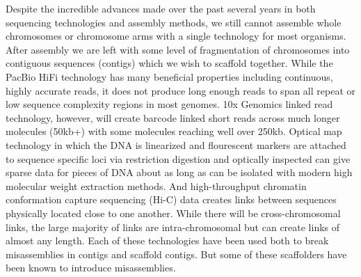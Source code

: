 \par{
Despite the incredible advances made over the past several years in both sequencing technologies and assembly methods, we still cannot assemble whole chromosomes or chromosome arms with a 
single technology for most organisms. After assembly we are left with some level of fragmentation of chromosomes into contiguous sequences (contigs) which we wish to scaffold together. While the 
PacBio HiFi technology has many beneficial properties including continuous, highly accurate reads, it does not produce long enough reads to span all repeat or low sequence complexity regions in most genomes.
 10x Genomics linked read technology, however, will create barcode linked short reads across much longer molecules (50kb+) with some molecules reaching well over 250kb\cite{10xlinked}. Optical map technology in which the DNA is linearized and flourescent markers are attached to sequence specific loci via restriction digestion and optically inspected can give sparse data for pieces of DNA about as long as can be isolated with modern high molecular weight extraction methods\cite{opticalmaps1}. And high-throughput chromatin conformation capture sequencing (Hi-C) data creates links between sequences physically located close to one another. While there will be cross-chromosomal links, the large majority of links are intra-chromosomal but can create links of almost any length\cite{3CHIC}\cite{hic2}. Each of these technologies have been used both to break misassemblies in contigs and scaffold contigs\cite{scaff10x}\cite{opticalmaphuman}\cite{hicscafffirst}\cite{SALSA}\cite{GRAAL}\cite{instaGRAAL}. But some of these scaffolders have been known to introduce misassemblies\cite{hicscafffirst}. 
} 


